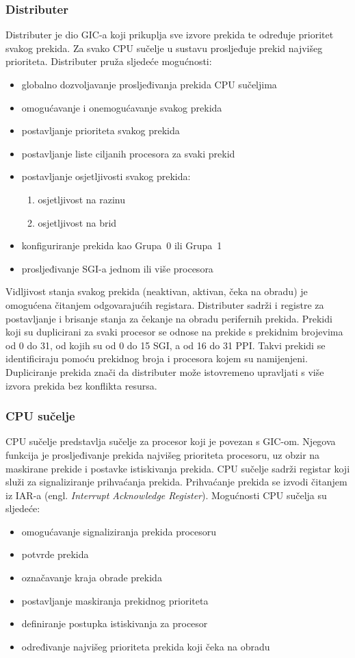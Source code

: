 \documentclass[times, utf8, diplomski, numeric]{fer}
\begin{document}
\subsubsection{Distributer}
Distributer je dio GIC-a koji prikuplja sve izvore prekida te određuje prioritet svakog prekida. Za svako CPU sučelje u
sustavu prosljeđuje prekid najvišeg prioriteta. Distributer pruža sljedeće mogućnosti:
\begin{itemize}
  \item{globalno dozvoljavanje prosljeđivanja prekida CPU sučeljima}
  \item{omogućavanje i onemogućavanje svakog prekida}
  \item{postavljanje prioriteta svakog prekida}
  \item{postavljanje liste ciljanih procesora za svaki prekid}
  \item{postavljanje osjetljivosti svakog prekida:}
  \begin{enumerate}
    \item{osjetljivost na razinu}
    \item{osjetljivost na brid}
  \end{enumerate}
  \item{konfiguriranje prekida kao Grupa~0 ili Grupa~1}
  \item{prosljeđivanje SGI-a jednom ili više procesora}
\end{itemize}
Vidljivost stanja svakog prekida (neaktivan, aktivan, čeka na obradu) je omogućena čitanjem odgovarajućih registara.
Distributer sadrži i registre za postavljanje i brisanje stanja za čekanje na obradu perifernih prekida. Prekidi koji
su duplicirani za svaki procesor se odnose na prekide s prekidnim brojevima od 0 do 31, od kojih su od 0 do 15 SGI, a
od 16 do 31 PPI. Takvi prekidi se identificiraju pomoću prekidnog broja i procesora kojem su namijenjeni. Dupliciranje
prekida znači da distributer može istovremeno upravljati s više izvora prekida bez konflikta resursa.

\subsubsection{CPU sučelje}
CPU sučelje predstavlja sučelje za procesor koji je povezan s GIC-om. Njegova funkcija je prosljeđivanje prekida najvišeg
prioriteta procesoru, uz obzir na maskirane prekide i postavke istiskivanja prekida. CPU sučelje sadrži registar koji
služi za signaliziranje prihvaćanja prekida. Prihvaćanje prekida se izvodi čitanjem iz IAR-a (engl. \textit{Interrupt
Acknowledge Register}). Mogućnosti CPU sučelja su sljedeće:
\begin{itemize}
  \item{omogućavanje signaliziranja prekida procesoru}
  \item{potvrde prekida}
  \item{označavanje kraja obrade prekida}
  \item{postavljanje maskiranja prekidnog prioriteta}
  \item{definiranje postupka istiskivanja za procesor}
  \item{određivanje najvišeg prioriteta prekida koji čeka na obradu}
\end{itemize}
\end{document}
